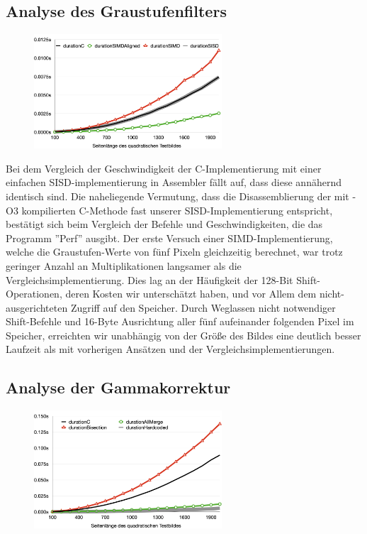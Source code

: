 \documentclass[course=erap]{aspdoc}
\begin{document}
	\subsection{Analyse des Graustufenfilters}
	\begin{figure}
		\includegraphics[width=7cm]{Images/Grayscale.png}
	\end{figure}
	Bei dem Vergleich der Geschwindigkeit der C-Implementierung mit einer einfachen SISD-implementierung in Assembler fällt auf, dass diese annähernd identisch sind. Die naheliegende Vermutung, dass die Disassemblierung der mit -O3 kompilierten C-Methode fast unserer SISD-Implementierung entspricht, bestätigt sich beim Vergleich der Befehle und Geschwindigkeiten, die das Programm ”Perf” ausgibt.
	Der erste Versuch einer SIMD-Implementierung, welche die Graustufen-Werte von fünf Pixeln gleichzeitig berechnet, war trotz geringer Anzahl an Multiplikationen langsamer als die Vergleichsimplementierung. Dies lag an der Häufigkeit der 128-Bit Shift-Operationen, deren Kosten wir unterschätzt haben, und vor Allem dem nicht-ausgerichteten Zugriff auf den Speicher.
	Durch Weglassen nicht notwendiger Shift-Befehle und 16-Byte Ausrichtung aller fünf aufeinander folgenden Pixel im Speicher, erreichten wir unabhängig von der Größe des Bildes eine deutlich besser Laufzeit als mit vorherigen Ansätzen und der Vergleichsimplementierungen.
	\subsection{Analyse der Gammakorrektur}
	\begin{figure}
		\includegraphics[width=7cm]{Images/Gammacorrection.png}
	\end{figure}
\end{document}

